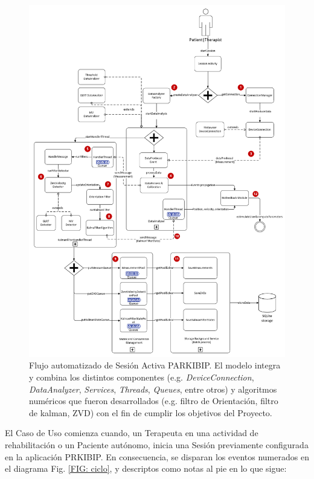 \begin{figure}[H]
    \vspace{-3.0cm}
    \hspace*{-2.0cm}%
    \includegraphics[clip,width=1.20 \columnwidth]{TESIS/imagenes/chap05/use-case-session.PNG}
    \caption{Flujo automatizado de Sesión Activa PARKIBIP. El modelo integra y combina los distintos componentes (e.g. \textit{DeviceConnection}, \textit{DataAnalyzer}, \textit{Services}, \textit{Threads}, \textit{Queues}, entre otros) y algoritmos numéricos que fueron desarrollados (e.g. filtro de Orientación, filtro de kalman, ZVD) con el fin de cumplir los objetivos del Proyecto. }
    \label{FIG:use-case-session}
\end{figure}

El Caso de Uso comienza cuando, un Terapeuta en una actividad de rehabilitación o un Paciente autónomo, inicia una Sesión previamente configurada en la aplicación PRKIBIP. En consecuencia, se disparan los eventos numerados en el diagrama Fig. \ref{FIG: ciclo}, y descriptos como notas al pie en lo que sigue:

